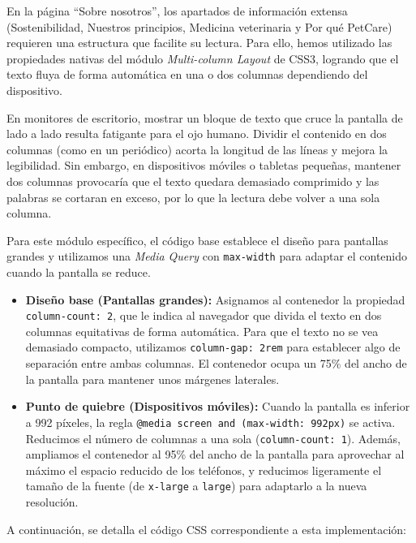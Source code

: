 \documentclass[11pt]{article}
\begin{document}
En la página ``Sobre nosotros'', los apartados de información extensa (Sostenibilidad, Nuestros principios, Medicina veterinaria y Por qué PetCare) requieren una estructura que facilite su lectura. Para ello, hemos utilizado las propiedades nativas del módulo \textit{Multi-column Layout} de CSS3, logrando que el texto fluya de forma automática en una o dos columnas dependiendo del dispositivo.

En monitores de escritorio, mostrar un bloque de texto que cruce la pantalla de lado a lado resulta fatigante para el ojo humano. Dividir el contenido en dos columnas (como en un periódico) acorta la longitud de las líneas y mejora la legibilidad. Sin embargo, en dispositivos móviles o tabletas pequeñas, mantener dos columnas provocaría que el texto quedara demasiado comprimido y las palabras se cortaran en exceso, por lo que la lectura debe volver a una sola columna.

Para este módulo específico, el código base establece el diseño para pantallas grandes y utilizamos una \textit{Media Query} con \texttt{max-width} para adaptar el contenido cuando la pantalla se reduce.

\begin{itemize}
    \item \textbf{Diseño base (Pantallas grandes):} Asignamos al contenedor la propiedad \texttt{column-count: 2}, que le indica al navegador que divida el texto en dos columnas equitativas de forma automática. Para que el texto no se vea demasiado compacto, utilizamos \texttt{column-gap: 2rem} para establecer algo de separación entre ambas columnas. El contenedor ocupa un 75\% del ancho de la pantalla para mantener unos márgenes laterales.
    \item \textbf{Punto de quiebre (Dispositivos móviles):} Cuando la pantalla es inferior a 992 píxeles, la regla \texttt{@media screen and (max-width: 992px)} se activa. Reducimos el número de columnas a una sola (\texttt{column-count: 1}). Además, ampliamos el contenedor al 95\% del ancho de la pantalla para aprovechar al máximo el espacio reducido de los teléfonos, y reducimos ligeramente el tamaño de la fuente (de \texttt{x-large} a \texttt{large}) para adaptarlo a la nueva resolución.
\end{itemize}

A continuación, se detalla el código CSS correspondiente a esta implementación:
\end{document}
